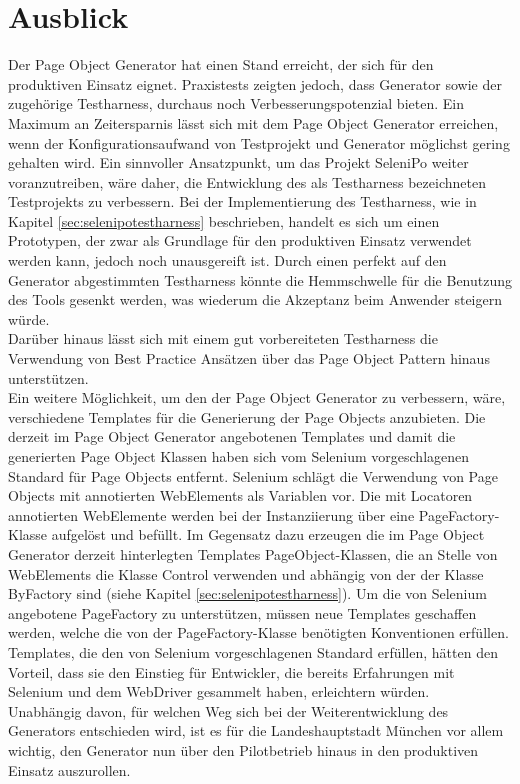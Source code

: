 \section{Ausblick}
\label{ausblick}
Der Page Object Generator hat einen Stand erreicht, der sich für den produktiven Einsatz eignet. Praxistests zeigten jedoch, dass Generator sowie der zugehörige Testharness, durchaus noch Verbesserungspotenzial bieten.
Ein Maximum an Zeitersparnis lässt sich mit dem Page Object Generator erreichen, wenn der Konfigurationsaufwand von Testprojekt und Generator möglichst gering gehalten wird.
Ein sinnvoller Ansatzpunkt, um das Projekt SeleniPo weiter voranzutreiben, wäre daher, die Entwicklung des als Testharness bezeichneten Testprojekts zu verbessern. Bei der Implementierung des Testharness, wie in Kapitel \ref{sec:selenipotestharness} beschrieben, handelt es sich um einen Prototypen, der zwar als Grundlage für den produktiven Einsatz verwendet werden kann, jedoch noch unausgereift ist. Durch einen perfekt auf den Generator abgestimmten Testharness könnte die Hemmschwelle für die Benutzung des Tools gesenkt werden, was wiederum die Akzeptanz beim Anwender steigern würde.\\
Darüber hinaus lässt sich mit einem gut vorbereiteten Testharness die Verwendung von Best Practice Ansätzen über das Page Object Pattern hinaus unterstützen.\\
Ein weitere Möglichkeit, um den der Page Object Generator zu verbessern, wäre, verschiedene Templates für die Generierung der Page Objects anzubieten.
Die derzeit im Page Object Generator angebotenen Templates und damit die generierten Page Object Klassen haben sich vom Selenium vorgeschlagenen Standard für Page Objects entfernt. Selenium schlägt die Verwendung von Page Objects mit annotierten WebElements als Variablen vor. Die mit Locatoren annotierten WebElemente werden bei der Instanziierung über eine PageFactory-Klasse aufgelöst und befüllt.
Im Gegensatz dazu erzeugen die im Page Object Generator derzeit hinterlegten Templates PageObject-Klassen, die an Stelle von WebElements die Klasse Control verwenden und abhängig von der der Klasse ByFactory sind (siehe Kapitel \ref{sec:selenipotestharness}). Um die von Selenium angebotene PageFactory zu unterstützen, müssen neue Templates geschaffen werden, welche die von der PageFactory-Klasse benötigten Konventionen erfüllen.
Templates, die den von Selenium vorgeschlagenen Standard erfüllen, hätten den Vorteil, dass sie den Einstieg für Entwickler, die bereits Erfahrungen mit Selenium und dem WebDriver gesammelt haben, erleichtern würden.\\
Unabhängig davon, für welchen Weg sich bei der Weiterentwicklung des Generators entschieden wird, ist es für die Landeshauptstadt München vor allem wichtig, den Generator nun über den Pilotbetrieb hinaus in den produktiven Einsatz auszurollen.












